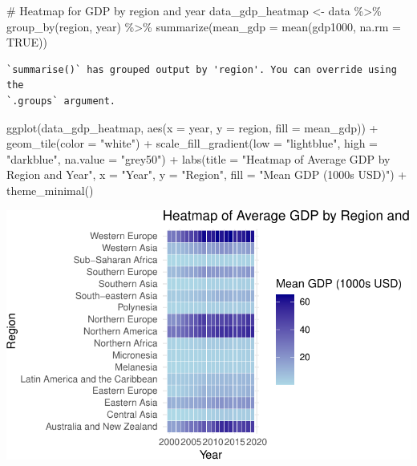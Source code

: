 \documentclass[
  letterpaper,
  DIV=11,
  numbers=noendperiod]{scrartcl}
\newenvironment{Shaded}{\begin{snugshade}}{\end{snugshade}}
\newcommand{\AttributeTok}[1]{\textcolor[rgb]{0.40,0.45,0.13}{#1}}
\newcommand{\CommentTok}[1]{\textcolor[rgb]{0.37,0.37,0.37}{#1}}
\newcommand{\ConstantTok}[1]{\textcolor[rgb]{0.56,0.35,0.01}{#1}}
\newcommand{\FunctionTok}[1]{\textcolor[rgb]{0.28,0.35,0.67}{#1}}
\newcommand{\NormalTok}[1]{\textcolor[rgb]{0.00,0.23,0.31}{#1}}
\newcommand{\OtherTok}[1]{\textcolor[rgb]{0.00,0.23,0.31}{#1}}
\newcommand{\SpecialCharTok}[1]{\textcolor[rgb]{0.37,0.37,0.37}{#1}}
\newcommand{\StringTok}[1]{\textcolor[rgb]{0.13,0.47,0.30}{#1}}
\begin{document}
\begin{Shaded}
\begin{Highlighting}[]
\CommentTok{\# Heatmap for GDP by region and year}
\NormalTok{data\_gdp\_heatmap }\OtherTok{\textless{}{-}}\NormalTok{ data }\SpecialCharTok{\%\textgreater{}\%} 
  \FunctionTok{group\_by}\NormalTok{(region, year) }\SpecialCharTok{\%\textgreater{}\%}
  \FunctionTok{summarize}\NormalTok{(}\AttributeTok{mean\_gdp =} \FunctionTok{mean}\NormalTok{(gdp1000, }\AttributeTok{na.rm =} \ConstantTok{TRUE}\NormalTok{))}
\end{Highlighting}
\end{Shaded}

\begin{verbatim}
`summarise()` has grouped output by 'region'. You can override using the
`.groups` argument.
\end{verbatim}

\begin{Shaded}
\begin{Highlighting}[]
\FunctionTok{ggplot}\NormalTok{(data\_gdp\_heatmap, }\FunctionTok{aes}\NormalTok{(}\AttributeTok{x =}\NormalTok{ year, }\AttributeTok{y =}\NormalTok{ region, }\AttributeTok{fill =}\NormalTok{ mean\_gdp)) }\SpecialCharTok{+}
  \FunctionTok{geom\_tile}\NormalTok{(}\AttributeTok{color =} \StringTok{"white"}\NormalTok{) }\SpecialCharTok{+}
  \FunctionTok{scale\_fill\_gradient}\NormalTok{(}\AttributeTok{low =} \StringTok{"lightblue"}\NormalTok{, }\AttributeTok{high =} \StringTok{"darkblue"}\NormalTok{, }\AttributeTok{na.value =} \StringTok{"grey50"}\NormalTok{) }\SpecialCharTok{+}
  \FunctionTok{labs}\NormalTok{(}\AttributeTok{title =} \StringTok{"Heatmap of Average GDP by Region and Year"}\NormalTok{, }\AttributeTok{x =} \StringTok{"Year"}\NormalTok{, }\AttributeTok{y =} \StringTok{"Region"}\NormalTok{, }\AttributeTok{fill =} \StringTok{"Mean GDP (1000s USD)"}\NormalTok{) }\SpecialCharTok{+}
  \FunctionTok{theme\_minimal}\NormalTok{()}
\end{Highlighting}
\end{Shaded}

\includegraphics{EDA_files/figure-pdf/unnamed-chunk-13-1.pdf}
\end{document}
